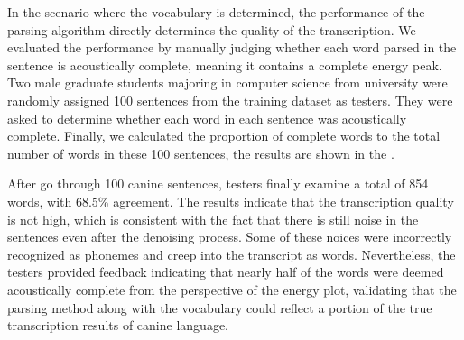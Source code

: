     In the scenario where the vocabulary is determined, the performance of the parsing algorithm directly determines the quality of the transcription. We evaluated the performance by manually judging whether each word parsed in the sentence is acoustically complete, meaning it contains a complete energy peak. Two male graduate students majoring in computer science from university were randomly assigned 100 sentences from the training dataset as testers. They were asked to determine whether each word in each sentence was acoustically complete. Finally, we calculated the proportion of complete words to the total number of words in these 100 sentences, the results are shown in the .

    After go through 100 canine sentences, testers finally examine a total of 854 words, with 68.5\% agreement. The results indicate that the 
transcription quality is not high, which is consistent with the fact that 
there is still noise in the sentences even after the denoising process. 
Some of these noices were incorrectly recognized as phonemes and creep into
the transcript as words.  Nevertheless, the testers provided feedback indicating that nearly half of the words were deemed acoustically complete from the perspective of the energy plot, validating that the parsing method along with the vocabulary could reflect a portion of the true transcription results of canine language.
